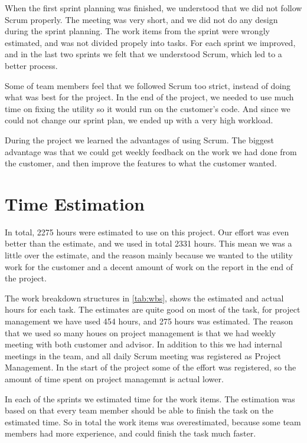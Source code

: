 When the first sprint planning was finished, we understood that we did not 
follow Scrum properly. The meeting was very short, and we did not do any 
design during the sprint planning. The work items from the sprint were wrongly
estimated, and was not divided propely into tasks. For each sprint we 
improved, and in the last two sprints we felt that we understood Scrum,
which led to a better process.

Some of team members feel that we followed Scrum too strict, instead of doing 
what was best for the project. In the end of the project, we needed to use 
much time on fixing the utility so it would run on the customer's code. And since we 
could not change our sprint plan, we ended up with a very high workload.

During the project we learned the advantages of using Scrum. The biggest advantage was that we could 
get weekly feedback on the work we had done from the customer, and then improve the features 
to what the customer wanted.

\section{Time Estimation}
In total, 2275 hours were estimated to use on this project. Our effort was
even better than the estimate, and we used in total 2331 hours. This mean we 
was a little over the estimate, and the reason mainly because we wanted to the 
utility work for the customer and a decent amount of work on the report in the 
end of the project. 

The work breakdown structures in \autoref{tab:wbs}, shows the estimated and 
actual hours for each task. The estimates are quite good on most of the task, 
for project management we have used 454 hours, and 275 hours was estimated. 
The reason that we used so many houes on project management is that we had 
weekly meeting with both customer and advisor. In addition to this we had 
internal meetings in the team, and all daily Scrum meeting was registered as 
Project Management. In the start of the project some of the effort was 
registered, so the amount of time spent on project managemnt is actual lower.

In each of the sprints we estimated time for the work items. The estimation 
was based on that every team member should be able to finish the task on the 
estimated time. So in total the work items was overestimated, because some 
team members had more experience, and could finish the task much faster.

